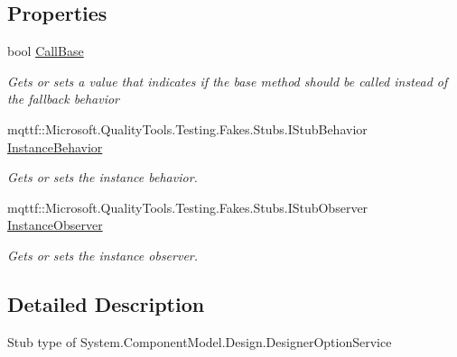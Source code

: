 \subsection*{Properties}
\begin{DoxyCompactItemize}
\item 
bool \hyperlink{class_system_1_1_component_model_1_1_design_1_1_fakes_1_1_stub_designer_option_service_a9678a6c165aea83e52316778dd89f1d6}{Call\-Base}
\begin{DoxyCompactList}\small\item\em Gets or sets a value that indicates if the base method should be called instead of the fallback behavior\end{DoxyCompactList}\item 
mqttf\-::\-Microsoft.\-Quality\-Tools.\-Testing.\-Fakes.\-Stubs.\-I\-Stub\-Behavior \hyperlink{class_system_1_1_component_model_1_1_design_1_1_fakes_1_1_stub_designer_option_service_a3fda9b96ea399e32069f8e51cb8232a5}{Instance\-Behavior}
\begin{DoxyCompactList}\small\item\em Gets or sets the instance behavior.\end{DoxyCompactList}\item 
mqttf\-::\-Microsoft.\-Quality\-Tools.\-Testing.\-Fakes.\-Stubs.\-I\-Stub\-Observer \hyperlink{class_system_1_1_component_model_1_1_design_1_1_fakes_1_1_stub_designer_option_service_abf0a0702d050e2ef53c96932dc8400cf}{Instance\-Observer}
\begin{DoxyCompactList}\small\item\em Gets or sets the instance observer.\end{DoxyCompactList}\end{DoxyCompactItemize}


\subsection{Detailed Description}
Stub type of System.\-Component\-Model.\-Design.\-Designer\-Option\-Service



